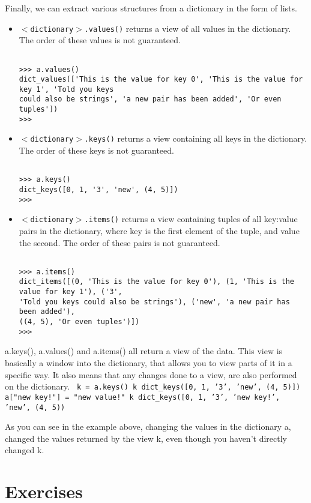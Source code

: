 Finally, we can extract various structures from a dictionary in the   form of lists.
\begin{itemize}
	\item 
\texttt{$<$dictionary$>$.values()} returns a view of      all values in the dictionary. The order of these     values is not guaranteed.      
\begin{lstlisting}

>>> a.values()
dict_values(['This is the value for key 0', 'This is the value for key 1', 'Told you keys
could also be strings', 'a new pair has been added', 'Or even tuples'])
>>>
\end{lstlisting}
	\item 
\texttt{$<$dictionary$>$.keys()} returns a view     containing all keys in the dictionary. The order of these keys     is not guaranteed.      
\begin{lstlisting}

>>> a.keys()
dict_keys([0, 1, '3', 'new', (4, 5)])
>>>
\end{lstlisting}
	\item 
\texttt{$<$dictionary$>$.items()} returns a view     containing tuples of all key:value pairs in the dictionary,     where key is the first element of the tuple, and value the     second. The order of these pairs is not guaranteed.      
\begin{lstlisting}

>>> a.items()
dict_items([(0, 'This is the value for key 0'), (1, 'This is the value for key 1'), ('3',
'Told you keys could also be strings'), ('new', 'a new pair has been added'),
((4, 5), 'Or even tuples')])
>>>
\end{lstlisting}
\end{itemize}

a.keys(), a.values() and a.items() all return a view of the data. This view is basically a window into the dictionary, that allows you to view parts of it in a specific way. It also means that any changes done to a view, are also performed on the dictionary.
\texttt{       k = a.keys()       k       dict\_keys([0, 1, '3', 'new', (4, 5)])       a["new key!"] = "new value!"       k       dict\_keys([0, 1, '3', 'new key!', 'new', (4, 5))     }

As you can see in the example above, changing the values in the dictionary a, changed the values returned by the view k, even though you haven't directly changed k. 

\section{Exercises}


